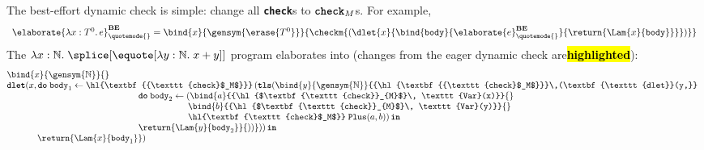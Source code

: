 The best-effort dynamic check is simple: change all \textbf{\texttt{check}}s to $\textbf{\texttt{check}}_M$s. For example, 
{
  \footnotesize
\[
\begin{array}{rcl}
\elaborate{\lambda x: T^0. \, e}_{\quotemode{}}^{\textbf{BE}} = \bind{x}{\gensym{\erase{T^0}}}{\checkm{(\dlet{x}{\bind{\texttt{body}}{\elaborate{e}_{\quotemode{}}^\textbf{BE}}{\return{\Lam{x}{\texttt{body}}}}})}}
\end{array}\]
}
The $\lambda x:\mathbb{N}. \; \splice[{\equote[\lambda{y}: \mathbb{N}. \; x+y]}]$ program elaborates into (changes from the eager dynamic check are\textbf{\hl{highlighted}}):
{
  \renewcommand{\varToAST}[1]{\hl{$\textbf{\texttt{check}}_{M}$}\, \texttt{Var}(#1)}
\[\begin{array}{@{}l}
  \bind{x}{\gensym{\mathbb{N}}}{} \\
  {\textbf{\texttt{dlet}}(}{x}, \textbf{\texttt{do}} \; {\texttt{body}_1} \leftarrow {{\hl{\textbf{{\texttt{check}$_M$}}}}}\,(\textbf{\texttt{tls}}({\bind{y}{\gensym{\mathbb{N}}}{{\hl{\textbf{{\texttt{check}$_M$}}}\,(\textbf{\texttt{dlet}}(y,}}} \\
    \quad\quad\quad\quad\quad\quad\quad
    \quad\quad\quad\quad\quad\quad\quad\;\;\,\,
    \textbf{\texttt{do}}\;{\texttt{body}_2} \leftarrow {(\bind{a}{{\varToAST{x}}}{}}\\
    \quad\quad\quad\quad\quad\quad\quad
    \quad\quad\quad\quad\quad\quad\quad
    \quad\quad\quad\quad\quad\quad\,\,\,
    \bind{b}{{\varToAST{y}}}{}\\
     \quad\quad\quad\quad\quad\quad\quad
    \quad\quad\quad\quad\quad\quad\quad
    \quad\quad\quad\quad\quad\quad\,\,\,
    \hl{\textbf{\texttt{check}$_M$}}\;{\texttt{Plus}(a, b)}) \, \textbf{\texttt{in}}\\
    \quad\quad\quad\quad\quad\quad\quad
    \quad\quad\quad\quad\quad\quad\quad\;\;\,\,
    \return{\Lam{y}{\texttt{body}_2}}{{))}})) \, \textbf{\texttt{in}}\\
  \quad\quad\quad\;\, {\return{\Lam{x}{\texttt{body}_1}}})
\end{array}\]
}

